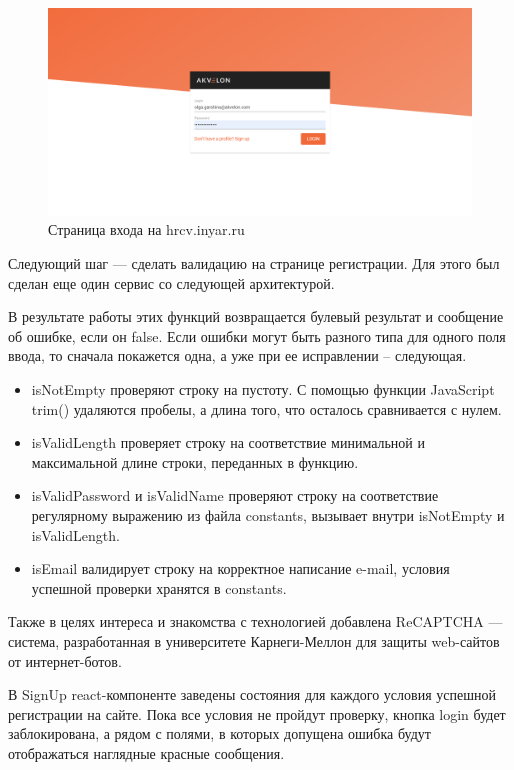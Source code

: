 \documentclass[12pt, a4paper]{diplom}
\begin{document}
\begin{figure}[!ht]
\centering
\includegraphics[width=1\textwidth]{resources/signin.png}
\caption{Страница входа на hrcv.inyar.ru}
\label{2}
\end{figure}

Следующий шаг — сделать валидацию на странице регистрации. Для этого был сделан еще один сервис со следующей архитектурой.
\medskip
{}
\medskip

В результате работы этих функций возвращается булевый результат и сообщение об ошибке, если он false.
Если ошибки могут быть разного типа для одного поля ввода, то сначала покажется одна, а уже при ее исправлении -- следующая.
\medskip

\begin{itemize}
\item isNotEmpty проверяют строку на пустоту. С помощью функции JavaScript trim() удаляются пробелы, а длина того, что осталось сравнивается с нулем.
\item isValidLength проверяет строку на соответствие минимальной и максимальной длине строки, переданных в функцию.
\item isValidPassword и isValidName проверяют строку на соответствие регулярному выражению из файла constants, вызывает внутри isNotEmpty и isValidLength.
\item isEmail валидирует строку на корректное написание e-mail, условия успешной проверки хранятся в constants.
\end{itemize}

Также в целях интереса и знакомства с технологией добавлена ReCAPTCHA\cite{captcha} — система, разработанная в университете Карнеги-Меллон для защиты web-сайтов от интернет-ботов.

В SignUp react-компоненте заведены состояния для каждого условия успешной регистрации на сайте. Пока все условия не пройдут проверку, кнопка login будет заблокирована,
а рядом с полями, в которых допущена ошибка будут отображаться наглядные красные сообщения.
\end{document}
